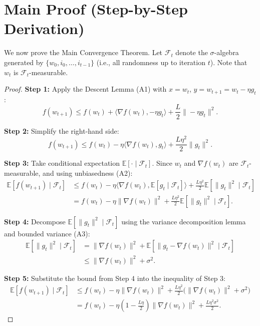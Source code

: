 \documentclass{article}
\begin{document}
\section*{Main Proof (Step-by-Step Derivation)}
We now prove the Main Convergence Theorem. Let $\mathcal{F}_t$ denote the $\sigma$-algebra generated by $\{w_0, i_0, \dots, i_{t-1}\}$ (i.e., all randomness up to iteration $t$). Note that $w_t$ is $\mathcal{F}_t$-measurable.

\begin{proof}
\textbf{Step 1:} Apply the Descent Lemma (A1) with $x = w_t$, $y = w_{t+1} = w_t - \eta g_t$:
\begin{equation}
    f(w_{t+1}) \le f(w_t) + \langle \nabla f(w_t), -\eta g_t \rangle + \frac{L}{2} \| -\eta g_t \|^2. \tag{Step 1}
\end{equation}

\textbf{Step 2:} Simplify the right-hand side:
\begin{equation}
    f(w_{t+1}) \le f(w_t) - \eta \langle \nabla f(w_t), g_t \rangle + \frac{L\eta^2}{2} \|g_t\|^2. \tag{Step 2}
\end{equation}

\textbf{Step 3:} Take conditional expectation $\mathbb{E}[\cdot \mid \mathcal{F}_t]$. Since $w_t$ and $\nabla f(w_t)$ are $\mathcal{F}_t$-measurable, and using unbiasedness (A2):
\begin{align}
    \mathbb{E}[f(w_{t+1}) \mid \mathcal{F}_t]
    &\le f(w_t) - \eta \langle \nabla f(w_t), \mathbb{E}[g_t \mid \mathcal{F}_t] \rangle + \frac{L\eta^2}{2} \mathbb{E}[\|g_t\|^2 \mid \mathcal{F}_t] \\
    &= f(w_t) - \eta \|\nabla f(w_t)\|^2 + \frac{L\eta^2}{2} \mathbb{E}[\|g_t\|^2 \mid \mathcal{F}_t]. \tag{Step 3}
\end{align}

\textbf{Step 4:} Decompose $\mathbb{E}[\|g_t\|^2 \mid \mathcal{F}_t]$ using the variance decomposition lemma and bounded variance (A3):
\begin{align}
    \mathbb{E}[\|g_t\|^2 \mid \mathcal{F}_t]
    &= \|\nabla f(w_t)\|^2 + \mathbb{E}[\|g_t - \nabla f(w_t)\|^2 \mid \mathcal{F}_t] \\
    &\le \|\nabla f(w_t)\|^2 + \sigma^2. \tag{Step 4}
\end{align}

\textbf{Step 5:} Substitute the bound from Step 4 into the inequality of Step 3:
\begin{align}
    \mathbb{E}[f(w_{t+1}) \mid \mathcal{F}_t]
    &\le f(w_t) - \eta \|\nabla f(w_t)\|^2 + \frac{L\eta^2}{2} \bigl( \|\nabla f(w_t)\|^2 + \sigma^2 \bigr) \\
    &= f(w_t) - \eta \left(1 - \frac{L\eta}{2}\right) \|\nabla f(w_t)\|^2 + \frac{L\eta^2\sigma^2}{2}. \tag{Step 5}
\end{align}


\end{proof}
\end{document}
